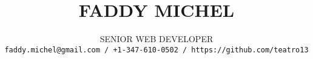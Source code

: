 \title{\uppercase{Faddy Michel}}
\author{\uppercase{Senior Web Developer}\\
\texttt{faddy.michel@gmail.com / +1-347-610-0502 / https://github.com/teatro13}}
\date{}
\maketitle
